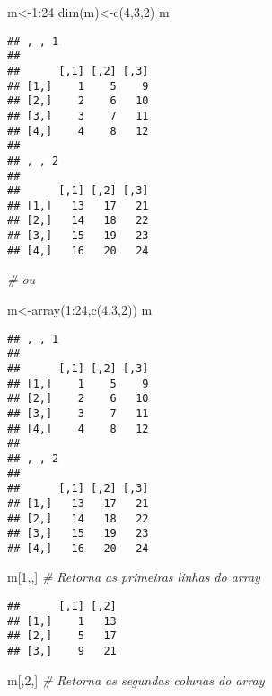 \documentclass[
]{book}
\newenvironment{Shaded}{\begin{snugshade}}{\end{snugshade}}
\newcommand{\CommentTok}[1]{\textcolor[rgb]{0.56,0.35,0.01}{\textit{#1}}}
\newcommand{\DecValTok}[1]{\textcolor[rgb]{0.00,0.00,0.81}{#1}}
\newcommand{\FunctionTok}[1]{\textcolor[rgb]{0.00,0.00,0.00}{#1}}
\newcommand{\NormalTok}[1]{#1}
\newcommand{\OtherTok}[1]{\textcolor[rgb]{0.56,0.35,0.01}{#1}}
\newcommand{\SpecialCharTok}[1]{\textcolor[rgb]{0.00,0.00,0.00}{#1}}
\begin{document}
\begin{Shaded}
\begin{Highlighting}[]
\NormalTok{m}\OtherTok{\textless{}{-}}\DecValTok{1}\SpecialCharTok{:}\DecValTok{24}
\FunctionTok{dim}\NormalTok{(m)}\OtherTok{\textless{}{-}}\FunctionTok{c}\NormalTok{(}\DecValTok{4}\NormalTok{,}\DecValTok{3}\NormalTok{,}\DecValTok{2}\NormalTok{)}
\NormalTok{m}
\end{Highlighting}
\end{Shaded}

\begin{verbatim}
## , , 1
## 
##      [,1] [,2] [,3]
## [1,]    1    5    9
## [2,]    2    6   10
## [3,]    3    7   11
## [4,]    4    8   12
## 
## , , 2
## 
##      [,1] [,2] [,3]
## [1,]   13   17   21
## [2,]   14   18   22
## [3,]   15   19   23
## [4,]   16   20   24
\end{verbatim}

\begin{Shaded}
\begin{Highlighting}[]
\CommentTok{\# ou}

\NormalTok{m}\OtherTok{\textless{}{-}}\FunctionTok{array}\NormalTok{(}\DecValTok{1}\SpecialCharTok{:}\DecValTok{24}\NormalTok{,}\FunctionTok{c}\NormalTok{(}\DecValTok{4}\NormalTok{,}\DecValTok{3}\NormalTok{,}\DecValTok{2}\NormalTok{))}
\NormalTok{m}
\end{Highlighting}
\end{Shaded}

\begin{verbatim}
## , , 1
## 
##      [,1] [,2] [,3]
## [1,]    1    5    9
## [2,]    2    6   10
## [3,]    3    7   11
## [4,]    4    8   12
## 
## , , 2
## 
##      [,1] [,2] [,3]
## [1,]   13   17   21
## [2,]   14   18   22
## [3,]   15   19   23
## [4,]   16   20   24
\end{verbatim}

\begin{Shaded}
\begin{Highlighting}[]
\NormalTok{m[}\DecValTok{1}\NormalTok{,,] }\CommentTok{\# Retorna as primeiras linhas do array}
\end{Highlighting}
\end{Shaded}

\begin{verbatim}
##      [,1] [,2]
## [1,]    1   13
## [2,]    5   17
## [3,]    9   21
\end{verbatim}

\begin{Shaded}
\begin{Highlighting}[]
\NormalTok{m[,}\DecValTok{2}\NormalTok{,] }\CommentTok{\# Retorna as segundas colunas do array}
\end{Highlighting}
\end{Shaded}
\end{document}
